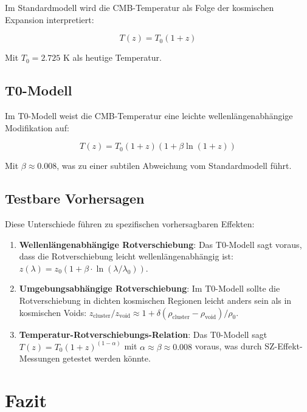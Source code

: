 \documentclass[a4paper,12pt]{article}
\theoremstyle{definition}
\theoremstyle{remark}
\begin{document}
	Im Standardmodell wird die CMB-Temperatur als Folge der kosmischen Expansion interpretiert:
	
	\begin{equation}
		T(z) = T_0 (1 + z)
	\end{equation}
	
	Mit $T_0 = 2.725$ K als heutige Temperatur.
	
	\subsection{T0-Modell}
	
	Im T0-Modell weist die CMB-Temperatur eine leichte wellenlängenabhängige Modifikation auf:
	
	\begin{equation}
		T(z) = T_0 (1 + z)(1 + \beta \ln(1 + z))
	\end{equation}
	
	Mit $\beta \approx 0.008$, was zu einer subtilen Abweichung vom Standardmodell führt.
	
	\subsection{Testbare Vorhersagen}
	
	Diese Unterschiede führen zu spezifischen vorhersagbaren Effekten:
	
	\begin{enumerate}
		\item \textbf{Wellenlängenabhängige Rotverschiebung}: Das T0-Modell sagt voraus, dass die Rotverschiebung leicht wellenlängenabhängig ist: $z(\lambda) = z_0(1 + \beta\cdot\ln(\lambda/\lambda_0))$.
		
		\item \textbf{Umgebungsabhängige Rotverschiebung}: Im T0-Modell sollte die Rotverschiebung in dichten kosmischen Regionen leicht anders sein als in kosmischen Voids: $z_\text{cluster}/z_\text{void} \approx 1 + \delta(\rho_\text{cluster}-\rho_\text{void})/\rho_0$.
		
		\item \textbf{Temperatur-Rotverschiebungs-Relation}: Das T0-Modell sagt $T(z) = T_0(1+z)^{(1-\alpha)}$ mit $\alpha \approx \beta \approx 0.008$ voraus, was durch SZ-Effekt-Messungen getestet werden könnte.
	\end{enumerate}
	
	\section{Fazit}
	
\end{document}
